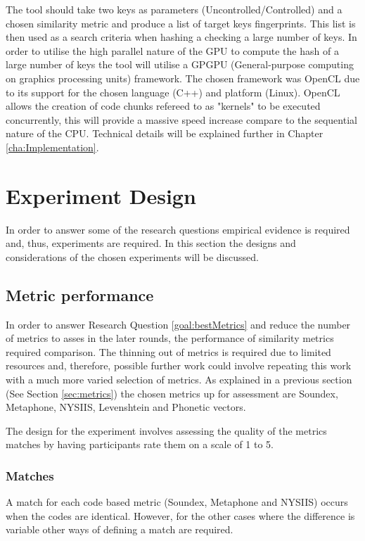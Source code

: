 The tool should take two keys as parameters (Uncontrolled/Controlled) and a chosen similarity metric and produce a list of target keys fingerprints. This list is then used as a search criteria when hashing a checking a large number of keys. In order to utilise the high parallel nature of the GPU to compute the hash of a large number of keys the tool will utilise a GPGPU (General-purpose computing on graphics processing units) framework. The chosen framework was OpenCL due to its support for the chosen language (C++) and platform (Linux). OpenCL allows the creation of code chunks refereed to as "kernels" to be executed concurrently, this will provide a massive speed increase compare to the sequential nature of the CPU. Technical details will be explained further in Chapter \ref{cha:Implementation}.

\section{Experiment Design}
In order to answer some of the research questions empirical evidence is required and, thus, experiments are required. In this section the designs and considerations of the chosen experiments will be discussed.

\subsection{Metric performance}
In order to answer Research Question \ref{goal:bestMetrics} and reduce the number of metrics to asses in the later rounds, the performance of similarity metrics required comparison. The thinning out of metrics is required due to limited resources and, therefore, possible further work could involve repeating this work with a much more varied selection of metrics. As explained in a previous section (See Section \ref{sec:metrics}) the chosen metrics up for assessment are Soundex, Metaphone, NYSIIS, Levenshtein and Phonetic vectors.

The design for the experiment involves assessing the quality of the metrics matches by having participants rate them on a scale of 1 to 5.

\subsubsection{Matches}
A match for each code based metric (Soundex, Metaphone and NYSIIS) occurs when the codes are identical. However, for the other cases where the difference is variable other ways of defining a match are required.

